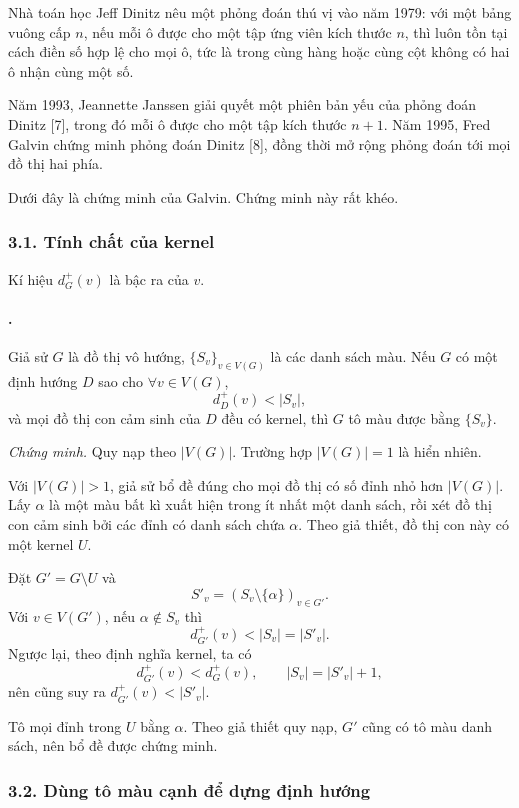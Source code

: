 \documentclass[11pt]{article}
\begin{document}
Nhà toán học Jeff Dinitz nêu một phỏng đoán thú vị vào năm 1979: với một bảng
vuông cấp \(n\), nếu mỗi ô được cho một tập ứng viên kích thước \(n\), thì luôn
tồn tại cách điền số hợp lệ cho mọi ô, tức là trong cùng hàng hoặc cùng cột
không có hai ô nhận cùng một số.

Năm 1993, Jeannette Janssen giải quyết một phiên bản yếu của phỏng đoán Dinitz
[7], trong đó mỗi ô được cho một tập kích thước \(n+1\). Năm 1995, Fred Galvin
chứng minh phỏng đoán Dinitz [8], đồng thời mở rộng phỏng đoán tới mọi đồ thị
hai phía.

Dưới đây là chứng minh của Galvin. Chứng minh này rất khéo.

\subsubsection*{3.1. Tính chất của kernel}

Kí hiệu \(d_G^+(v)\) là bậc ra của \(v\).

\paragraph{.}
Giả sử \(G\) là đồ thị vô hướng, \(\{S_v\}_{v\in V(G)}\) là các danh sách màu.
Nếu \(G\) có một định hướng \(D\) sao cho \(\forall v\in V(G)\),
\[
  d_D^+(v)<|S_v|,
\]
và mọi đồ thị con cảm sinh của \(D\) đều có kernel, thì \(G\) tô màu được bằng
\(\{S_v\}\).

\emph{Chứng minh.}
Quy nạp theo \(|V(G)|\). Trường hợp \(|V(G)|=1\) là hiển nhiên.

Với \(|V(G)|>1\), giả sử bổ đề đúng cho mọi đồ thị có số đỉnh nhỏ hơn
\(|V(G)|\). Lấy \(\alpha\) là một màu bất kì xuất hiện trong ít nhất một danh
sách, rồi xét đồ thị con cảm sinh bởi các đỉnh có danh sách chứa \(\alpha\).
Theo giả thiết, đồ thị con này có một kernel \(U\).

Đặt \(G'=G\setminus U\) và
\[
  S'_v=(S_v\setminus\{\alpha\})_{v\in G'}.
\]
Với \(v\in V(G')\), nếu \(\alpha\notin S_v\) thì
\[
  d_{G'}^+(v)<|S_v|=|S'_v|.
\]
Ngược lại, theo định nghĩa kernel, ta có
\[
  d_{G'}^+(v)<d_G^+(v),\qquad |S_v|=|S'_v|+1,
\]
nên cũng suy ra \(d_{G'}^+(v)<|S'_v|\).

Tô mọi đỉnh trong \(U\) bằng \(\alpha\). Theo giả thiết quy nạp, \(G'\) cũng có
tô màu danh sách, nên bổ đề được chứng minh.

\subsubsection*{3.2. Dùng tô màu cạnh để dựng định hướng}
\end{document}
